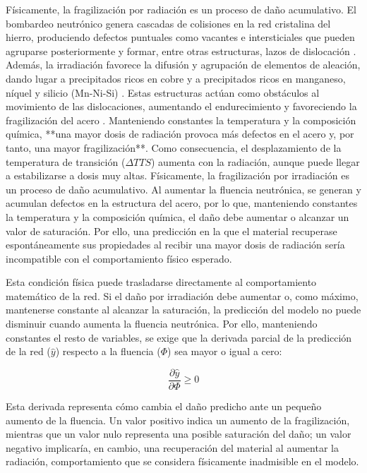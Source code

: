 \documentclass[a4paper, 12pt, twocolumn]{book}
\begin{document}
Físicamente, la fragilización por radiación es un proceso de daño acumulativo. El bombardeo neutrónico genera cascadas de colisiones en la red cristalina del hierro, produciendo defectos puntuales como vacantes e intersticiales que pueden agruparse posteriormente y formar, entre otras estructuras, lazos de dislocación \cite{slugen2002}. Además, la irradiación favorece la difusión y agrupación de elementos de aleación, dando lugar a precipitados ricos en cobre y a precipitados ricos en manganeso, níquel y silicio (Mn-Ni-Si) \cite{odette2021precipitation}. Estas estructuras actúan como obstáculos al movimiento de las dislocaciones, aumentando el endurecimiento y favoreciendo la fragilización del acero \cite{bergner2015}. Manteniendo constantes la temperatura y la composición química, **una mayor dosis de radiación provoca más defectos en el acero y, por tanto, una mayor fragilización**. Como consecuencia, el desplazamiento de la temperatura de transición ($\Delta TTS$) aumenta con la radiación, aunque puede llegar a estabilizarse a dosis muy altas. Físicamente, la fragilización por irradiación es un proceso de daño acumulativo. Al aumentar la fluencia neutrónica, se generan y acumulan defectos en la estructura del acero, por lo que, manteniendo constantes la temperatura y la composición química, el daño debe aumentar o alcanzar un valor de saturación. Por ello, una predicción en la que el material recuperase espontáneamente sus propiedades al recibir una mayor dosis de radiación sería incompatible con el comportamiento físico esperado.

Esta condición física puede trasladarse directamente al comportamiento matemático de la red. Si el daño por irradiación debe aumentar o, como máximo, mantenerse constante al alcanzar la saturación, la predicción del modelo no puede disminuir cuando aumenta la fluencia neutrónica. Por ello, manteniendo constantes el resto de variables, se exige que la derivada parcial de la predicción de la red ($\hat{y}$) respecto a la fluencia ($\Phi$) sea mayor o igual a cero:

\begin{equation}
    \frac{\partial \hat{y}}{\partial \Phi} \geq 0
\end{equation}

Esta derivada representa cómo cambia el daño predicho ante un pequeño aumento de la fluencia. Un valor positivo indica un aumento de la fragilización, mientras que un valor nulo representa una posible saturación del daño; un valor negativo implicaría, en cambio, una recuperación del material al aumentar la radiación, comportamiento que se considera físicamente inadmisible en el modelo.
\end{document}
